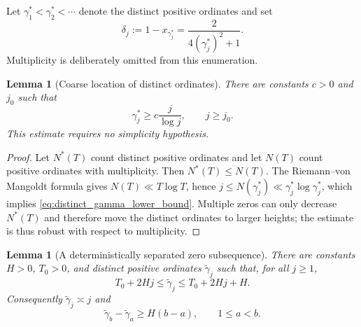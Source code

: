 \documentclass[preprint,12pt]{elsarticle}
\numberwithin{equation}{section}
\theoremstyle{plain}
\newtheorem{lemma}[theorem]{Lemma}
\theoremstyle{definition}
\theoremstyle{remark}
\begin{document}
Let $\gamma_1^*<\gamma_2^*<\cdots$ denote the distinct positive ordinates and set
\begin{equation}
\delta_j:=1-x_{\gamma_j^*}=\frac{2}{4(\gamma_j^*)^2+1}.
\label{eq:delta_distinct_nodes}
\end{equation}
Multiplicity is deliberately omitted from this enumeration.

\begin{lemma}[Coarse location of distinct ordinates]
\label{lem:distinct_ordinate_lower_bound}
There are constants $c>0$ and $j_0$ such that
\begin{equation}
\gamma_j^*\ge c\frac{j}{\log j},
\qquad j\ge j_0.
\label{eq:distinct_gamma_lower_bound}
\end{equation}
This estimate requires no simplicity hypothesis.
\end{lemma}

\begin{proof}
Let $N^*(T)$ count distinct positive ordinates and let $N(T)$ count positive ordinates with multiplicity. Then $N^*(T)\le N(T)$. The Riemann--von Mangoldt formula gives $N(T)\ll T\log T$, hence
$j\le N(\gamma_j^*)\ll \gamma_j^*\log\gamma_j^*$, which implies \eqref{eq:distinct_gamma_lower_bound}. Multiple zeros can only decrease $N^*(T)$ and therefore move the distinct ordinates to larger heights; the estimate is thus robust with respect to multiplicity.
\end{proof}

\begin{lemma}[A deterministically separated zero subsequence]
\label{lem:separated_zero_subsequence}
There are constants $H>0$, $T_0>0$, and distinct positive ordinates $\widetilde\gamma_j$ such that, for all $j\ge1$,
\begin{equation}
T_0+2Hj\le \widetilde\gamma_j\le T_0+2Hj+H.
\label{eq:separated_gamma_boxes}
\end{equation}
Consequently $\widetilde\gamma_j\asymp j$ and
\begin{equation}
\widetilde\gamma_b-\widetilde\gamma_a\ge H(b-a),
\qquad 1\le a<b.
\label{eq:separated_gamma_gap}
\end{equation}
\end{lemma}
\end{document}
